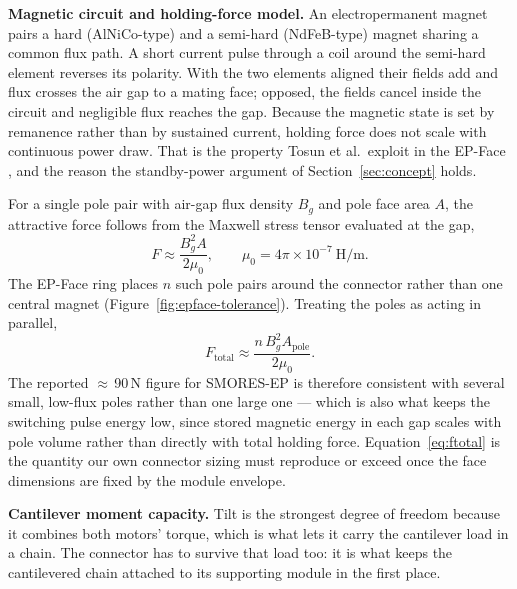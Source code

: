 \documentclass[11pt,a4paper]{article}
\newif\ifreview
\newcommand{\pending}[1]{\ifreview{\color{blue}#1}\else#1\fi}
\begin{document}
\pending{%
\noindent\textbf{Magnetic circuit and holding-force model.} An electropermanent
magnet pairs a hard (AlNiCo-type) and a semi-hard (NdFeB-type) magnet sharing a
common flux path. A short current pulse through a coil around the semi-hard
element reverses its polarity. With the two elements aligned their fields add
and flux crosses the air gap to a mating face; opposed, the fields cancel
inside the circuit and negligible flux reaches the gap. Because the magnetic
state is set by remanence rather than by sustained current, holding force does
not scale with continuous power draw. That is the property Tosun et al.\
exploit in the EP-Face \cite{tosun2016}, and the reason the standby-power
argument of Section~\ref{sec:concept} holds.

For a single pole pair with air-gap flux density $B_g$ and pole face area $A$,
the attractive force follows from the Maxwell stress tensor evaluated at the
gap,
\begin{equation}
  F \approx \frac{B_g^2 A}{2\mu_0},
  \qquad \mu_0 = 4\pi \times 10^{-7}\ \text{H/m}.
  \label{eq:maxwell}
\end{equation}
The EP-Face ring places $n$ such pole pairs around the connector rather than
one central magnet (Figure~\ref{fig:epface-tolerance}). Treating the poles as
acting in parallel,
\begin{equation}
  F_{\text{total}} \approx \frac{n\,B_g^2 A_{\text{pole}}}{2\mu_0}.
  \label{eq:ftotal}
\end{equation}
The reported $\approx$\,90\,N figure for SMORES-EP \cite{liu2023,tosun2016} is
therefore consistent with several small, low-flux poles rather than one large
one --- which is also what keeps the switching pulse energy low, since stored
magnetic energy in each gap scales with pole volume rather than directly with
total holding force. Equation~\eqref{eq:ftotal} is the quantity our own
connector sizing must reproduce or exceed once the face dimensions are fixed by
the module envelope.

\noindent\textbf{Cantilever moment capacity.} Tilt is the strongest degree of
freedom because it combines both motors' torque, which is what lets it carry
the cantilever load in a chain. The connector has to survive that load too: it
is what keeps the cantilevered chain attached to its supporting module in the
first place.

}
\end{document}
